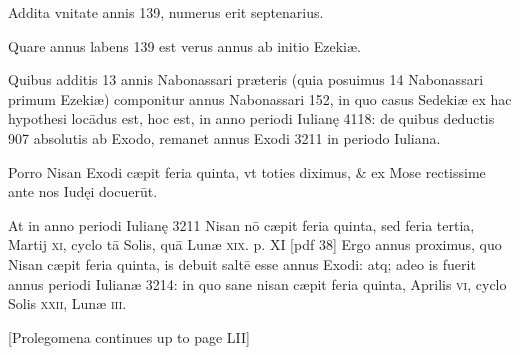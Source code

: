 \begin{parnumbers}
Addita vnitate annis 139, numerus erit septenarius. 

Quare annus labens 139 est verus annus ab initio Ezekiæ.

Quibus additis 13 annis Nabonassari præteris (quia posuimus 14 Nabonassari primum Ezekiæ) componitur annus Nabonassari 152, in quo casus Sedekiæ ex hac hypothesi locādus est, hoc est, in anno periodi Iulianę 4118: de quibus deductis 907 absolutis ab Exodo, remanet annus Exodi 3211 in periodo Iuliana.

Porro Nisan Exodi cæpit feria quinta, vt toties diximus, \& ex Mose rectissime ante nos Iudęi docuerūt.

At in anno periodi Iulianę 3211 Nisan nō cæpit feria quinta, sed feria tertia, Martij \textsc{xi}, cyclo tā Solis, quā Lunæ \textsc{xix}.
\clearpage
p. XI [pdf 38]
Ergo annus proximus, quo Nisan cæpit feria quinta, is debuit saltē esse annus Exodi: atq; adeo is fuerit annus periodi Iulianæ 3214: in quo sane nisan cæpit feria quinta, Aprilis \textsc{vi},
cyclo Solis \textsc{xxii}, Lunæ \textsc{iii}.

[Prolegomena continues up to page LII]

\end{parnumbers}
